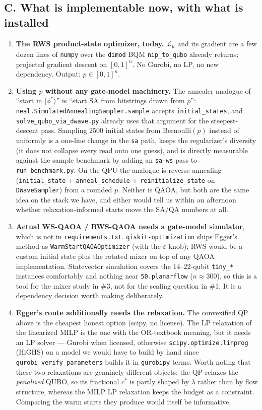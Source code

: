 \documentclass[11pt]{article}
\newcommand{\code}[1]{\texttt{#1}}
\begin{document}
\subsection*{C. What is implementable now, with what is installed}

\begin{enumerate}[leftmargin=1.5em]
\item \textbf{The RWS product-state optimizer, today.} $\mathcal L_\mu$ and its gradient are a few dozen lines of \code{numpy} over the \code{dimod} BQM \code{nip\_to\_qubo} already returns; projected gradient descent on $[0,1]^n$. No Gurobi, no LP, no new dependency. Output: $p \in [0,1]^n$.

\item \textbf{Using $p$ without any gate-model machinery.} The annealer analogue of ``start in $|\phi^*\rangle$'' is ``start SA from bitstrings drawn from $p$'': \code{neal.SimulatedAnnealingSampler.sample} accepts \code{initial\_states}, and \code{solve\_qubo\_via\_dwave.py} already uses that argument for the steepest-descent pass. Sampling $2500$ initial states from $\mathrm{Bernoulli}(p)$ instead of uniformly is a one-line change in the \code{sa} path, keeps the regularizer's diversity (it does not collapse every read onto one guess), and is directly measurable against the sample benchmark by adding an \code{sa-ws} pass to \code{run\_benchmark.py}. On the QPU the analogue is reverse annealing (\code{initial\_state} + \code{anneal\_schedule} + \code{reinitialize\_state} on \code{DWaveSampler}) from a rounded $p$. Neither is QAOA, but both are the same idea on the stack we have, and either would tell us within an afternoon whether relaxation-informed starts move the SA/QA numbers at all.

\item \textbf{Actual WS-QAOA / RWS-QAOA needs a gate-model simulator}, which is not in \code{requirements.txt}. \code{qiskit-optimization} ships Egger's method as \code{WarmStartQAOAOptimizer} (with the $\varepsilon$ knob); RWS would be a custom initial state plus the rotated mixer on top of any QAOA implementation. Statevector simulation covers the $14$--$22$-qubit \code{tiny\_*} instances comfortably and nothing near \code{50.planarflow} ($n \approx 300$), so this is a tool for the mixer study in \#3, not for the scaling question in \#1. It is a dependency decision worth making deliberately.

\item \textbf{Egger's route additionally needs the relaxation.} The convexified QP above is the cheapest honest option (scipy, no license). The LP relaxation of the linearized MILP is the one with the OR-textbook meaning, but it needs an LP solver --- Gurobi when licensed, otherwise \code{scipy.optimize.linprog} (HiGHS) on a model we would have to build by hand since \code{gurobi\_verify\_parameters} builds it in \code{gurobipy} terms. Worth noting that these two relaxations are genuinely different objects: the QP relaxes the \emph{penalized} QUBO, so its fractional $c^*$ is partly shaped by $\lambda$ rather than by flow structure, whereas the MILP LP relaxation keeps the budget as a constraint. Comparing the warm starts they produce would itself be informative.


\end{enumerate}
\end{document}
